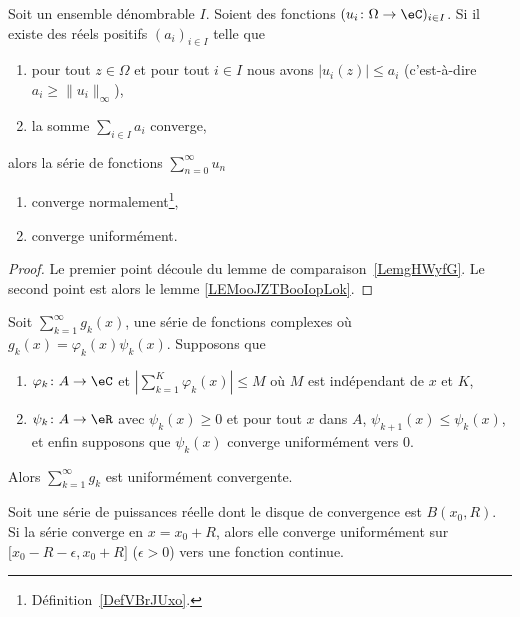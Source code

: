 \begin{lemma}			\label{LEMooJDYSooRnurKb}
	Soit un ensemble dénombrable \( I\). Soient des fonctions \( (u_i\colon \Omega\to \eC)_{i\in I}\). Si il existe des réels positifs \( (a_i)_{i\in I}\) telle que
	\begin{enumerate}
		\item
		      pour tout \( z\in \Omega\) et pour tout \( i\in I\) nous avons \( | u_i(z) |\leq a_i\) (c'est-à-dire \( a_i\geq \| u_i \|_{\infty}\)),
		\item
		      la somme \( \sum_{i\in I}a_i\) converge,
	\end{enumerate}
	alors la série de fonctions \( \sum_{n=0}^{\infty}u_n\)
	\begin{enumerate}
		\item
		      converge normalement\footnote{Définition~\ref{DefVBrJUxo}.},
		\item
		      converge uniformément.
	\end{enumerate}
\end{lemma}

\begin{proof}
	Le premier point découle du lemme de comparaison~\ref{LemgHWyfG}. Le second point est alors le lemme \ref{LEMooJZTBooIopLok}.
\end{proof}

\begin{theorem}				\label{ThoSerCritAbel}
	Soit \( \sum_{k=1}^{\infty}g_k(x)\), une série de fonctions complexes où \( g_k(x)=\varphi_k(x)\psi_k(x)\). Supposons que
	\begin{enumerate}

		\item
		      \( \varphi_k\colon A\to \eC\) et \( | \sum_{k=1}^K\varphi_k(x) |\leq M\) où \( M\) est indépendant de \( x\) et \( K\),
		\item
		      \( \psi_k\colon A\to \eR\) avec \( \psi_k(x)\geq 0\) et pour tout \( x\) dans \( A\), \( \psi_{k+1}(x)\leq \psi_k(x)\), et enfin supposons que \( \psi_k(x)\) converge uniformément vers \( 0\).

	\end{enumerate}
	Alors \( \sum_{k=1}^{\infty}g_k\) est uniformément convergente.
\end{theorem}

\begin{theorem}		\label{ThoAbelSeriePuiss}
	Soit une série de puissances réelle dont le disque de convergence est \( B(x_0,R)\). Si la série converge en \( x=x_0+R\), alors elle converge uniformément sur \( \mathopen[ x_0-R-\epsilon , x_0+R \mathclose]\) (\( \epsilon>0\)) vers une fonction continue.
\end{theorem}

